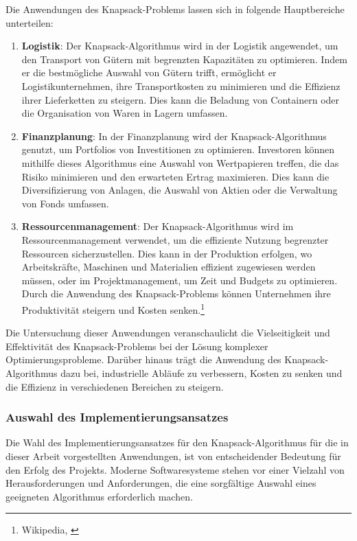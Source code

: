 \begin{itemize}
Die Anwendungen des Knapsack-Problems lassen sich in folgende Hauptbereiche unterteilen:
\begin{enumerate}
\item \textbf{Logistik}: Der Knapsack-Algorithmus wird in der Logistik angewendet, um den Transport von Gütern mit
begrenzten Kapazitäten zu optimieren. Indem er die bestmögliche Auswahl von Gütern trifft, ermöglicht er Logistikunternehmen,
ihre Transportkosten zu minimieren und die Effizienz ihrer Lieferketten zu steigern. Dies kann die Beladung von Containern oder die Organisation von Waren in Lagern umfassen.
\item \textbf{Finanzplanung}: In der Finanzplanung wird der Knapsack-Algorithmus genutzt, um Portfolios von Investitionen
zu optimieren. Investoren können mithilfe dieses Algorithmus eine Auswahl von Wertpapieren treffen, die das Risiko
minimieren und den erwarteten Ertrag maximieren. Dies kann die Diversifizierung von Anlagen, die Auswahl von Aktien
oder die Verwaltung von Fonds umfassen.
\item \textbf{Ressourcenmanagement}: Der Knapsack-Algorithmus wird im Ressourcenmanagement verwendet, um die effiziente
Nutzung begrenzter Ressourcen sicherzustellen. Dies kann in der Produktion erfolgen, wo Arbeitskräfte, Maschinen und
Materialien effizient zugewiesen werden müssen, oder im Projektmanagement, um Zeit und Budgets zu optimieren. Durch
die Anwendung des Knapsack-Problems können Unternehmen ihre Produktivität steigern und Kosten senken.\footnote{Wikipedia, \cite{Knapsack-Problem Anwendungen}}
\end{enumerate}

Die Untersuchung dieser Anwendungen veranschaulicht die Vielseitigkeit und Effektivität des Knapsack-Problems bei der Lösung
komplexer Optimierungsprobleme. Darüber hinaus trägt die Anwendung des Knapsack-Algorithmus dazu bei, industrielle Abläufe
zu verbessern, Kosten zu senken und die Effizienz in verschiedenen Bereichen zu steigern.

\subsubsection{Auswahl des Implementierungsansatzes}
Die Wahl des Implementierungsansatzes für den Knapsack-Algorithmus für die in dieser Arbeit vorgestellten Anwendungen, ist von entscheidender Bedeutung
für den Erfolg des Projekts. Moderne Softwaresysteme stehen vor einer Vielzahl von Herausforderungen und Anforderungen,
die eine sorgfältige Auswahl eines geeigneten Algorithmus erforderlich machen.


\end{itemize}
